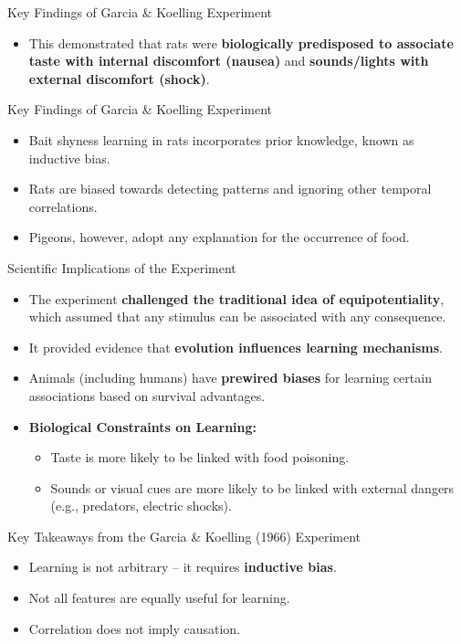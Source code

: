 \documentclass{beamer}
\begin{document}
\begin{frame}{Key Findings of Garcia \& Koelling Experiment }
    \begin{itemize}
        \item This demonstrated that rats were \textbf{biologically predisposed to associate taste with internal discomfort (nausea)} and \textbf{sounds/lights with external discomfort (shock)}.
    \end{itemize}
\end{frame}

\begin{frame}{Key Findings of Garcia \& Koelling Experiment}
    \begin{itemize}
        \item Bait shyness learning in rats incorporates prior knowledge, known as inductive bias.
        \item Rats are biased towards detecting patterns and ignoring other temporal correlations.
        \item Pigeons, however, adopt any explanation for the occurrence of food.
    \end{itemize}
\end{frame}

\begin{frame}{Scientific Implications of the Experiment}
    \begin{itemize}
        \item The experiment \textbf{challenged the traditional idea of equipotentiality}, which assumed that any stimulus can be associated with any consequence.
        \item It provided evidence that \textbf{evolution influences learning mechanisms}.
        \item Animals (including humans) have \textbf{prewired biases} for learning certain associations based on survival advantages.
        \item \textbf{Biological Constraints on Learning:}
        \begin{itemize}
            \item Taste is more likely to be linked with food poisoning.
            \item Sounds or visual cues are more likely to be linked with external dangers (e.g., predators, electric shocks).
        \end{itemize}
    \end{itemize}
\end{frame}

\begin{frame}{Key Takeaways from the Garcia \& Koelling (1966) Experiment}
    \begin{itemize}
        \item Learning is not arbitrary – it requires \textbf{inductive bias}.
        \item Not all features are equally useful for learning.\@
        \item Correlation does not imply causation.
    \end{itemize}
\end{frame}
\end{document}
